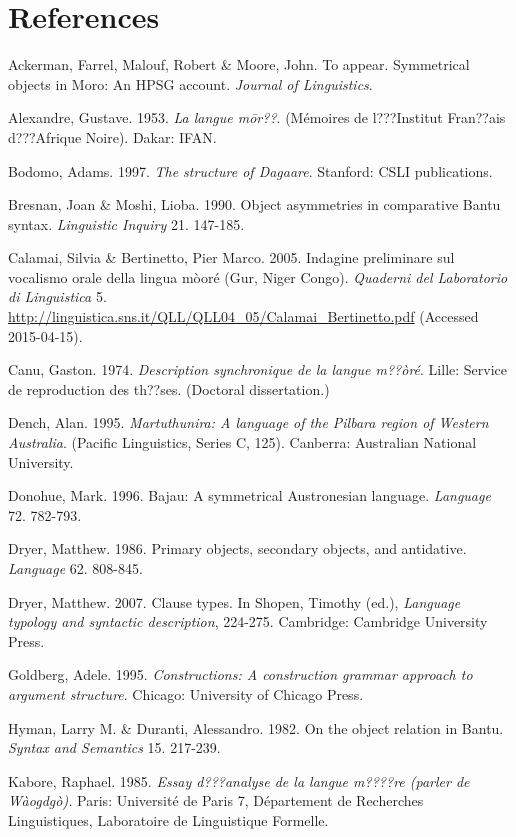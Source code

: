 \documentclass[output=paper]{langsci/langscibook}
\begin{document}
{{{{{{{\section{References}

Ackerman, Farrel, Malouf, Robert \& Moore, John. To appear. Symmetrical objects in Moro: An HPSG account. \textit{Journal of Linguistics}. 

Alexandre, Gustave. 1953. \textit{La langue m\=or??}. (M\'{e}moires de l???Institut Fran??ais d???Afrique Noire). Dakar: IFAN. 

Bodomo, Adams. 1997. \textit{The structure of Dagaare}. Stanford: CSLI publications.

Bresnan, Joan \& Moshi, Lioba. 1990. Object asymmetries in comparative Bantu syntax. \textit{Linguistic Inquiry} 21. 147-185. 

Calamai, Silvia \& Bertinetto, Pier Marco. 2005. Indagine preliminare sul vocalismo orale della lingua m\`{o}or\'{e} (Gur, Niger Congo). \textit{Quaderni del Laboratorio di Linguistica} 5. \url{http://linguistica.sns.it/QLL/QLL04_05/Calamai_Bertinetto.pdf} (Accessed 2015-04-15). 

Canu, Gaston. 1974. \textit{Description synchronique de la langue m??\`{o}r\'{e}}. Lille: Service de reproduction des th??ses. (Doctoral dissertation.)

Dench, Alan. 1995. \textit{Martuthunira: A language of the Pilbara region of Western Australia}. (Pacific Linguistics, Series C, 125). Canberra: Australian National University.  

Donohue, Mark. 1996. Bajau: A symmetrical Austronesian language. \textit{Language} 72. 782-793.

Dryer, Matthew. 1986. Primary objects, secondary objects, and antidative. \textit{Language} 62. 808-845.

Dryer, Matthew. 2007. Clause types. In Shopen, Timothy (ed.), \textit{Language typology and syntactic description}, 224-275. Cambridge: Cambridge University Press. 

Goldberg, Adele. 1995. \textit{Constructions: A construction grammar approach to argument structure}. Chicago: University of Chicago Press. 

Hyman, Larry M. \& Duranti, Alessandro. 1982. On the object relation in Bantu. \textit{Syntax and Semantics} 15. 217-239. 

Kabore, Raphael. 1985. \textit{Essay d???analyse de la langue m????re (parler de W\`{a}ogdg\`{o}).} Paris: Universit\'{e} de Paris 7, D\'{e}partement de Recherches Linguistiques, Laboratoire de Linguistique Formelle. 

}}}}}}}
\end{document}
